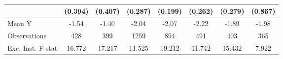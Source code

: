 {\begin{tabular}{l*{7}{c}}
            &     (0.394)         &     (0.407)         &     (0.287)         &     (0.199)         &     (0.262)         &     (0.279)         &     (0.867)         \\
\midrule
Mean Y      &       -1.54         &       -1.40         &       -2.04         &       -2.07         &       -2.22         &       -1.89         &       -1.98         \\
Observations&         428         &         399         &        1259         &         894         &         491         &         403         &         365         \\
Exc. Inst. F-stat&      16.772         &      17.217         &      11.525         &      19.212         &      11.742         &      15.432         &       7.922         \\
\bottomrule
\end{tabular}
}
